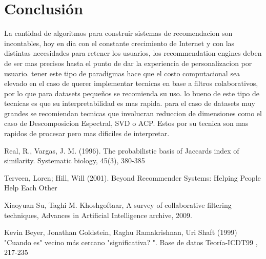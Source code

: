 \documentclass[12pt, a4paper]{article} %
\begin{document}
\medskip
\newpage

\section{Conclusión}

La cantidad de algoritmos para construir sistemas de recomendacion son incontables, hoy en dia con el constante crecimiento de Internet
y con las distintas necesidades para retener los usuarios, los recommendation engines deben de ser mas precisos hasta el punto de 
dar la experiencia de personalizacion por usuario. tener este tipo de paradigmas hace que el costo computacional sea elevado en el 
caso de querer implementar tecnicas en base a filtros colaborativos, por lo que para datasets pequeños se recomienda su uso. lo bueno
de este tipo de tecnicas es que su interpretabilidad es mas rapida. para el caso de datasets muy grandes se recomiendan tecnicas que involucran 
reduccion de dimensiones como el caso de Descomposicion Espectral, SVD o ACP. Estos por su tecnica son mas rapidos de procesar
pero mas dificiles de interpretar. 

\newpage


\begin{thebibliography}{9}


\printbibliography[title={Bibliography}] %
Real, R., Vargas, J. M. (1996). The probabilistic basis of Jaccards index of similarity. Systematic biology, 45(3), 380-385

Terveen, Loren; Hill, Will (2001). Beyond Recommender Systems: Helping People Help Each Other

Xiaoyuan Su, Taghi M. Khoshgoftaar, A survey of collaborative filtering techniques, Advances in Artificial Intelligence archive, 2009.

Kevin Beyer, Jonathan Goldstein, Raghu Ramakrishnan, Uri Shaft (1999) "Cuando es" vecino más cercano "significativa? ". Base de datos Teoría-ICDT99 , 217-235

\end{thebibliography}

\end{document}

